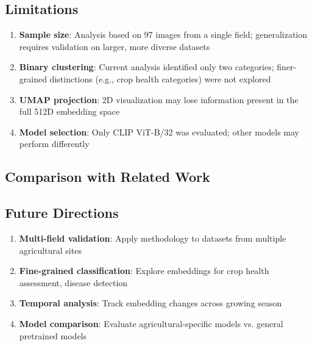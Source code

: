 \subsection{Limitations}

\begin{enumerate}
    \item \textbf{Sample size}: Analysis based on 97 images from a single field; generalization requires validation on larger, more diverse datasets

    \item \textbf{Binary clustering}: Current analysis identified only two categories; finer-grained distinctions (e.g., crop health categories) were not explored

    \item \textbf{UMAP projection}: 2D visualization may lose information present in the full 512D embedding space

    \item \textbf{Model selection}: Only CLIP ViT-B/32 was evaluated; other models may perform differently
\end{enumerate}


\subsection{Comparison with Related Work}


\subsection{Future Directions}

\begin{enumerate}
    \item \textbf{Multi-field validation}: Apply methodology to datasets from multiple agricultural sites
    \item \textbf{Fine-grained classification}: Explore embeddings for crop health assessment, disease detection
    \item \textbf{Temporal analysis}: Track embedding changes across growing season
    \item \textbf{Model comparison}: Evaluate agricultural-specific models vs. general pretrained models
\end{enumerate}
